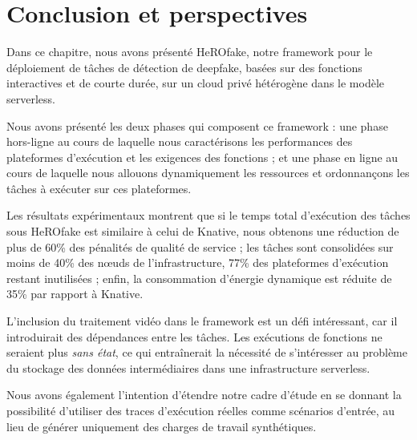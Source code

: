 \section{Conclusion et perspectives}
\label{section:herofake-conclusion}

Dans ce chapitre, nous avons présenté HeROfake, notre framework pour le déploiement de tâches de détection de deepfake, basées sur des fonctions interactives et de courte durée, sur un cloud privé hétérogène dans le modèle serverless.

Nous avons présenté les deux phases qui composent ce framework : une phase hors-ligne au cours de laquelle nous caractérisons les performances des plateformes d'exécution et les exigences des fonctions ; et une phase en ligne au cours de laquelle nous allouons dynamiquement les ressources et ordonnançons les tâches à exécuter sur ces plateformes.

Les résultats expérimentaux montrent que si le temps total d'exécution des tâches sous HeROfake est similaire à celui de Knative, nous obtenons une réduction de plus de 60\% des pénalités de qualité de service ; les tâches sont consolidées sur moins de 40\% des nœuds de l'infrastructure, 77\% des plateformes d'exécution restant inutilisées ; enfin, la consommation d'énergie dynamique est réduite de 35\% par rapport à Knative.

L'inclusion du traitement vidéo dans le framework est un défi intéressant, car il introduirait des dépendances entre les tâches. Les exécutions de fonctions ne seraient plus \textit{sans état}, ce qui entraînerait la nécessité de s'intéresser au problème du stockage des données intermédiaires dans une infrastructure serverless.

Nous avons également l'intention d'étendre notre cadre d'étude en se donnant la possibilité d'utiliser des traces d'exécution réelles comme scénarios d'entrée, au lieu de générer uniquement des charges de travail synthétiques.
